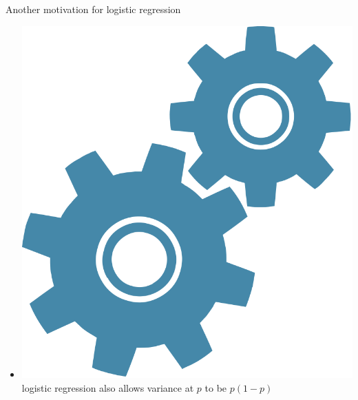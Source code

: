 \documentclass[10pt,t]{beamer}
\begin{document}
\begin{frame}{Another motivation for logistic regression}
\begin{itemize}
		\item \includegraphics[scale = 0.015]{figs/technical} logistic regression also allows variance at $p$ to be $p(1-p)$
	\end{itemize}

	
\end{frame}
\end{document}
